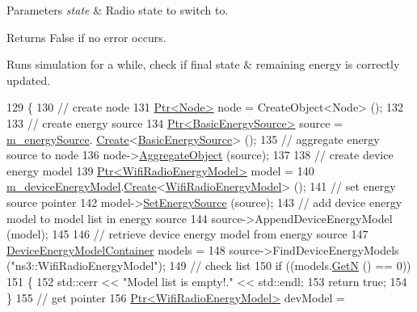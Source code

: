 \begin{DoxyParams}{Parameters}
{\em state} & Radio state to switch to. \\
\hline
\end{DoxyParams}
\begin{DoxyReturn}{Returns}
False if no error occurs.
\end{DoxyReturn}
Runs simulation for a while, check if final state \& remaining energy is correctly updated. 
\begin{DoxyCode}
129 \{
130   \textcolor{comment}{// create node}
131   \hyperlink{classns3_1_1Ptr}{Ptr<Node>} node = CreateObject<Node> ();
132 
133   \textcolor{comment}{// create energy source}
134   \hyperlink{classns3_1_1Ptr}{Ptr<BasicEnergySource>} source = \hyperlink{classBasicEnergyUpdateTest_a6e597bf5827d66a852d1bac88278d648}{m\_energySource}.
      \hyperlink{classns3_1_1ObjectFactory_a18152e93f0a6fe184ed7300cb31e9896}{Create}<\hyperlink{classns3_1_1BasicEnergySource}{BasicEnergySource}> ();
135   \textcolor{comment}{// aggregate energy source to node}
136   node->\hyperlink{classns3_1_1Object_a79dd435d300f3deca814553f561a2922}{AggregateObject} (source);
137 
138   \textcolor{comment}{// create device energy model}
139   \hyperlink{classns3_1_1Ptr}{Ptr<WifiRadioEnergyModel>} model =
140     \hyperlink{classBasicEnergyUpdateTest_a8ae0adecca7e9f7d1db89ccb33dd5ae4}{m\_deviceEnergyModel}.\hyperlink{classns3_1_1ObjectFactory_a18152e93f0a6fe184ed7300cb31e9896}{Create}<\hyperlink{classns3_1_1WifiRadioEnergyModel}{WifiRadioEnergyModel}> ();
141   \textcolor{comment}{// set energy source pointer}
142   model->\hyperlink{classns3_1_1WifiRadioEnergyModel_a6ac586c77ee4ac849e6b09bd4caf0cf4}{SetEnergySource} (source);
143   \textcolor{comment}{// add device energy model to model list in energy source}
144   source->AppendDeviceEnergyModel (model);
145 
146   \textcolor{comment}{// retrieve device energy model from energy source}
147   \hyperlink{classns3_1_1DeviceEnergyModelContainer}{DeviceEnergyModelContainer} models =
148     source->FindDeviceEnergyModels (\textcolor{stringliteral}{"ns3::WifiRadioEnergyModel"});
149   \textcolor{comment}{// check list}
150   \textcolor{keywordflow}{if} ((models.\hyperlink{classns3_1_1DeviceEnergyModelContainer_a025e2ac459646ce218645a5f9329a3fa}{GetN} () == 0))
151     \{
152       std::cerr << \textcolor{stringliteral}{"Model list is empty!."} << std::endl;
153       \textcolor{keywordflow}{return} \textcolor{keyword}{true};
154     \}
155   \textcolor{comment}{// get pointer}
156   \hyperlink{classns3_1_1Ptr}{Ptr<WifiRadioEnergyModel>} devModel =

\end{DoxyCode}
